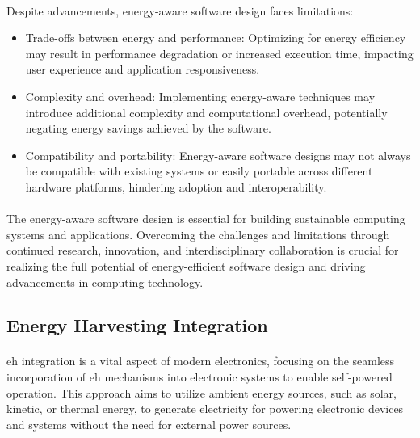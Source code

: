         \paragraph{}
        Despite advancements, energy-aware software design faces limitations:
        \begin{itemize}
            \item Trade-offs between energy and performance: Optimizing for energy efficiency may result in performance degradation or increased execution time, impacting user experience and application responsiveness\cite{EHandEE}.
            \item Complexity and overhead: Implementing energy-aware techniques may introduce additional complexity and computational overhead, potentially negating energy savings achieved by the software.
            \item Compatibility and portability: Energy-aware software designs may not always be compatible with existing systems or easily portable across different hardware platforms, hindering adoption and interoperability\cite{basedArticle}.
        \end{itemize}
        
        \paragraph{}
        The energy-aware software design is essential for building sustainable computing systems and applications. Overcoming the challenges and limitations through continued research, innovation, and interdisciplinary collaboration is crucial for realizing the full potential of energy-efficient software design and driving advancements in computing technology.



    \subsection{Energy Harvesting Integration}
    
        \paragraph{}
        \gls{eh} integration is a vital aspect of modern electronics, focusing on the seamless incorporation of \gls{eh} mechanisms into electronic systems to enable self-powered operation. This approach aims to utilize ambient energy sources, such as solar, kinetic, or thermal energy, to generate electricity for powering electronic devices and systems without the need for external power sources.

